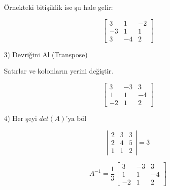 \documentclass[12pt,fleqn]{article}\usepackage{../../common}
\begin{document}
Örnekteki bitişiklik ise şu hale gelir:

$$
\left[\begin{array}{rrr}
3 & 1 & -2 \\
-3 & 1 & 1 \\
3 & -4 & 2
\end{array}\right]
$$

3) Devriğini Al (Transpose)

Satırlar ve kolonların yerini değiştir.

$$
\left[\begin{array}{rrr}
3 & -3 & 3 \\
1 & 1 & -4 \\
-2 & 1 & 2
\end{array}\right]
$$

4) Her şeyi $det(A)$'ya böl

$$
\left|\begin{array}{rrr}
2 & 3 & 3 \\
2 & 4 & 5 \\
1 & 1 & 2
\end{array}\right| = 3
$$

$$ A^{-1} =
\frac{1}{3}
\left[\begin{array}{rrr}
3 & -3 & 3 \\
1 & 1 & -4 \\
-2 & 1 & 2
\end{array}\right]
$$
\end{document}
